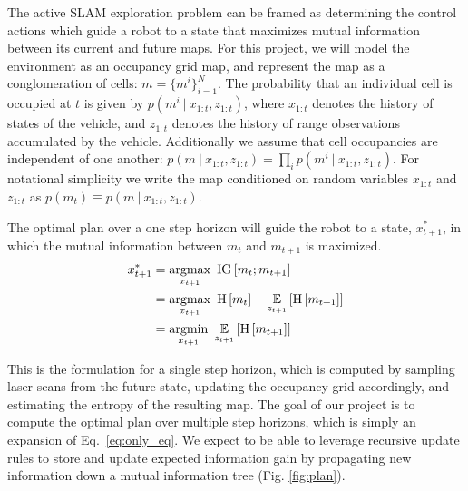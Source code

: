 %
The active SLAM exploration problem can be framed as determining the control actions which guide a robot to a state that maximizes mutual information between its current and future maps. For this project, we will model the environment as an occupancy grid map, and represent the map as a conglomeration of cells: $m = \{m^{i}\}_{i=1}^{N}$. The probability that an individual cell is occupied at $t$ is given by $p\left(m^{i} \ \vert \ x_{1:t}, z_{1:t}\right)$, where $x_{1:t}$ denotes the history of states of the vehicle, and $z_{1:t}$ denotes the history of range observations accumulated by the vehicle. Additionally we assume that cell occupancies  are independent of one another: $p\left(m \ \vert \ x_{1:t}, z_{1:t}\right) = \prod_{i} p\left(m^{i} \ \vert \ x_{1:t}, z_{1:t}\right)$. For notational simplicity we write the map conditioned on random variables $x_{1:t}$ and $z_{1:t}$ as $p\left(m_{t}\right) \equiv p\left(m \ \vert \ x_{1:t}, z_{1:t}\right)$.

The optimal plan over a one step horizon will guide the robot to a state, $x_{t+1}^{*}$, in which the mutual information between $m_{t}$ and $m_{t+1}$ is maximized.
\begin{align}  \begin{split}
    x_{t+1}^{*}
    &=
    \argmax_{x_{t+1}}
    \
    \text{IG}\left[
        m_{t}
        ;
        m_{t+1}
    \right]
    \\
    &=
    \argmax_{x_{t+1}}
    \
    \text{H}\left[
        m_{t}
    \right]
    -
    \expect_{z_{t+1}}\left[
        \text{H}\left[
            m_{t+1}
        \right]
    \right]
    \\
    &=
    \argmin_{x_{t+1}}
    \
    \expect_{z_{t+1}}\left[
        \text{H}\left[
            m_{t+1}
        \right]
    \right]
\end{split}
\label{eq:only_eq}
\end{align}

This is the formulation for a single step horizon, which is computed by sampling laser scans from the future state, updating the occupancy grid accordingly, and estimating the entropy of the resulting map. The goal of our project is to compute the optimal plan over multiple step horizons, which is simply an expansion of Eq.~\eqref{eq:only_eq}. We expect to be able to leverage recursive update rules to store and update expected information gain by propagating new information down a mutual information tree (Fig. \ref{fig:plan}).
